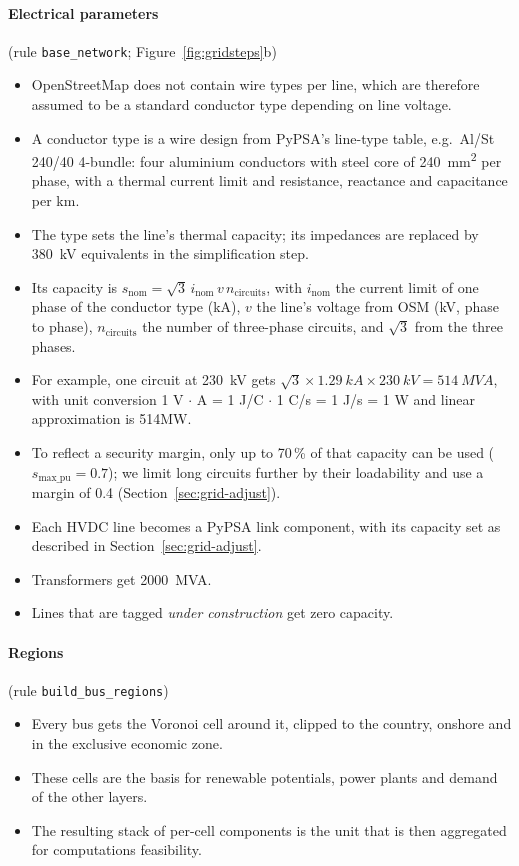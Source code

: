 \paragraph{Electrical parameters} (rule \texttt{base\_network}; Figure~\ref{fig:gridsteps}b)
\begin{itemize}[nosep,leftmargin=*]
    \item OpenStreetMap does not contain wire types per line, which are therefore assumed to be a standard conductor type depending on line voltage.
  \item A conductor type is a wire design from PyPSA's line-type table, e.g.\ Al/St 240/40 4-bundle: four aluminium conductors with steel core of \SI{240}{mm^2} per phase, with a thermal current limit and resistance, reactance and capacitance per km.
  \item The type sets the line's thermal capacity; its impedances are replaced by \SI{380}{kV} equivalents in the simplification step.
\end{itemize}

\begin{itemize}[nosep,leftmargin=*]
  \item Its capacity is $s_\text{nom} = \sqrt{3}\, i_\text{nom}\, v\, n_\text{circuits}$, with $i_\text{nom}$ the current limit of one phase of the conductor type (kA), $v$ the line's voltage from OSM (kV, phase to phase), $n_\text{circuits}$ the number of three-phase circuits, and $\sqrt{3}$ from the three phases.
  \item For example, one circuit at \SI{230}{kV} gets $\sqrt{3} \times \SI{1.29}{kA} \times \SI{230}{kV} = \SI{514}{MVA}$, with unit conversion 1 V $\cdot$ A = 1 J/C $\cdot$ 1 C/s = 1 J/s = 1 W and linear approximation is 514MW.
  \item To reflect a security margin, only up to 70\,\% of that capacity can be used ($s_\text{max\_pu} = 0.7$); we limit long circuits further by their loadability and use a margin of 0.4 (Section~\ref{sec:grid-adjust}).
  \item Each HVDC line becomes a PyPSA link component, with its capacity set as described in Section~\ref{sec:grid-adjust}.
  \item Transformers get \SI{2000}{MVA}.
  \item Lines that are tagged \textit{under construction} get zero capacity.
\end{itemize}


\paragraph{Regions} (rule \texttt{build\_bus\_regions})
\begin{itemize}[nosep,leftmargin=*]
  \item Every bus gets the Voronoi cell around it, clipped to the country, onshore and in the exclusive economic zone.
  \item These cells are the basis for renewable potentials, power plants and demand of the other layers.
  \item The resulting stack of per-cell components is the unit that is then aggregated for computations feasibility.
\end{itemize}

